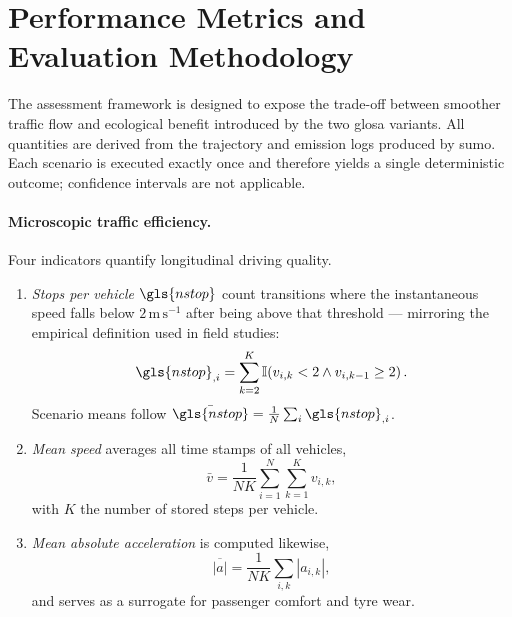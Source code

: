 \section{Performance Metrics and Evaluation Methodology}
\label{sec:performance_evaluation}

The assessment framework is designed to expose the trade-off between smoother traffic flow and ecological benefit introduced by the two \ac{glosa} variants. All quantities are derived from the trajectory and emission logs produced by \ac{sumo}. Each scenario is executed exactly once and therefore yields a single deterministic outcome; confidence intervals are not applicable.

\paragraph{Microscopic traffic efficiency.}
Four indicators quantify longitudinal driving quality.

\begin{enumerate}[label=\textbf{(\roman*)}]
\item \emph{Stops per vehicle} $\gls{nstop}$ count transitions where the instantaneous speed falls below \(2\,\mathrm{m\,s^{-1}}\) after being above that threshold --- mirroring the empirical definition used in field studies:
\begin{equation}
    \gls{nstop}_{,i}= \sum_{k=2}^{K}{\mathbb I}\!\left(v_{i,k}<2 \land v_{i,k-1}\ge 2\right).
\end{equation}
Scenario means follow $\bar \gls{nstop} = \tfrac1N\sum_i \gls{nstop}_{,i}$.

\item \emph{Mean speed} averages all time stamps of all vehicles,
\begin{equation}
    \bar v = \frac1{N K}\sum_{i=1}^{N}\sum_{k=1}^{K} v_{i,k},
\end{equation}
with \(K\) the number of stored steps per vehicle.

\item \emph{Mean absolute acceleration} is computed likewise,
\begin{equation}
    \overline{|a|} = \frac1{N K}\sum_{i,k}|a_{i,k}|,
\end{equation}
and serves as a surrogate for passenger comfort and tyre wear.
\end{enumerate}

